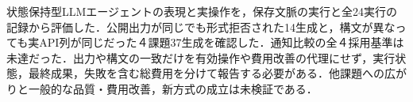 状態保持型LLMエージェントの表現と実操作を，保存文脈の実行と全24実行の記録から評価した．公開出力が同じでも形式拒否された14生成と，構文が異なっても実API列が同じだった４課題37生成を確認した．通知比較の全４採用基準は未達だった．出力や構文の一致だけを有効操作や費用改善の代理にせず，実行状態，最終成果，失敗を含む総費用を分けて報告する必要がある．他課題への広がりと一般的な品質・費用改善，新方式の成立は未検証である．
